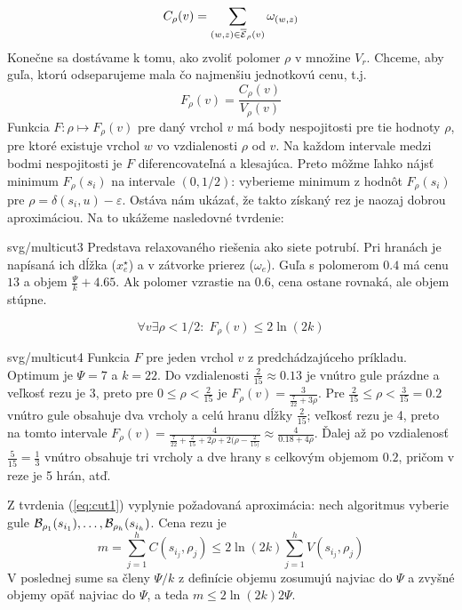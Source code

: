 \noindent
\begin{minipage}[t]{0.5\textwidth-1cm}
\noindent
$$C_\rho(v)=\sum_{(w,z)\in\overline{\cal E}_\rho(v)}\omega_{(w,z)}$$
Konečne sa dostávame k tomu, ako zvoliť polomer $\rho$ v množine $V_r$. Chceme, aby guľa, ktorú odseparujeme mala čo 
najmenšiu jednotkovú cenu, t.j.
$$F_\rho(v)=\frac{C_\rho(v)}{V_\rho(v)}$$
Funkcia $F:\rho\mapsto F_\rho(v)$ pre daný vrchol $v$ má body nespojitosti pre tie hodnoty $\rho$, pre ktoré
existuje vrchol $w$ vo vzdialenosti $\rho$ od $v$. Na každom intervale medzi bodmi nespojitosti je $F$ diferencovateľná
a klesajúca.
Preto môžme ľahko nájsť minimum $F_\rho(s_i)$ na intervale $(0,1/2)$: vyberieme minimum z hodnôt 
$F_\rho(s_i)$ pre $\rho=\delta(s_i,u)-\varepsilon$.
Ostáva nám ukázať, že takto získaný rez je naozaj dobrou aproximáciou. Na to ukážeme nasledovné tvrdenie:
\end{minipage}\hspace*{1cm}\begin{minipage}[t]{0.5\textwidth}
\begin{myfig}{0.7\textwidth}{svg/multicut3}
  Predstava relaxovaného riešenia ako siete potrubí. Pri hranách je napísaná ich dĺžka ($x_e^\star$) a v zátvorke 
  prierez ($\omega_e$). 
  Guľa s polomerom $0.4$ má cenu $13$ a objem $\frac{\Psi}{k}+4.65$. Ak polomer vzrastie na $0.6$, cena ostane rovnaká,
  ale objem stúpne.
\end{myfig}
\end{minipage}
\noindent
\begin{equation}
\label{eq:cut1}
\forall v\exists\rho<1/2:\;F_\rho(v)\le2\ln(2k)
\end{equation}

\begin{myfig}{\textwidth}{svg/multicut4}
  Funkcia $F$ pre jeden vrchol $v$ z predchádzajúceho príkladu. Optimum je $\Psi=7$ a $k=22$.
  Do vzdialenosti $\frac{2}{15}\approx 0.13$ je vnútro gule prázdne a veľkosť rezu
  je 3, preto pre $0\le\rho<\frac{2}{15}$ je $F_\rho(v)=\frac{3}{\frac{7}{22}+3\rho}$.
  Pre $\frac{2}{15}\le\rho<\frac{3}{15}=0.2$ vnútro gule obsahuje dva vrcholy a celú hranu dĺžky $\frac{2}{15}$;
  veľkosť rezu je 4, preto na tomto intervale $F_\rho(v)=\frac{4}{\frac{7}{22}+\frac{2}{15}+2\rho+2(\rho-\frac{2}{15)}}
  \approx\frac{4}{0.18+4\rho}$. Ďalej až po vzdialenosť $\frac{5}{15}=\frac{1}{3}$ 
  vnútro obsahuje tri vrcholy a dve hrany s celkovým objemom $0.2$, pričom v reze je 5 hrán, atď.
\end{myfig}

\noindent
Z tvrdenia (\ref{eq:cut1}) vyplynie požadovaná aproximácia: nech algoritmus vyberie gule ${\cal B}_{\rho_1}(s_{i_1}),\ldots,
{\cal B}_{\rho_h}(s_{i_h})$. Cena rezu je
$$m=\sum_{j=1}^hC(s_{i_j},\rho_j)\le2\ln(2k)\sum_{j=1}^hV(s_{i_j},\rho_j)$$
V poslednej sume sa členy $\Psi/k$ z definície objemu zosumujú najviac do $\Psi$ a zvyšné objemy opäť
najviac do $\Psi$, a teda $m\le2\ln(2k)2\Psi$.

